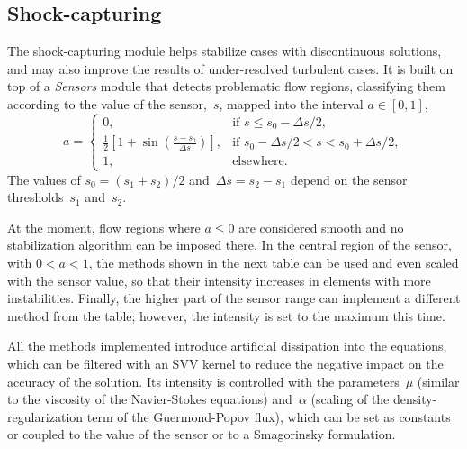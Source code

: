 \documentclass[a4paper,10pt]{report}
\begin{document}
\subsection{Shock-capturing}

The shock-capturing module helps stabilize cases with discontinuous solutions, and may also improve the results of under-resolved turbulent cases. It is built on top of a \textit{Sensors} module that detects problematic flow regions, classifying them according to the value of the sensor,~$s$, mapped into the interval $a \in [0,1]$,
%
\begin{equation*}
    a = \left\{\begin{array}{ll}
        0, & \text{if } s \leq s_0 - \Delta s / 2, \\
        \frac{1}{2}\left[1+\sin\left(\frac{s-s_0}{\Delta s}\right)\right], & \text{if } s_0 - \Delta s / 2 < s < s_0 + \Delta s / 2,  \\
        1, & \text{elsewhere}.
    \end{array}\right.
\end{equation*}
%
The values of $s_0 = (s_1 + s_2)/2$ and~$\Delta s = s_2 - s_1$ depend on the sensor thresholds~$s_1$ and~$s_2$.

At the moment, flow regions where $a \leq 0$ are considered smooth and no stabilization algorithm can be imposed there. In the central region of the sensor, with $0 < a < 1$, the methods shown in the next table can be used and even scaled with the sensor value, so that their intensity increases in elements with more instabilities. Finally, the higher part of the sensor range can implement a different method from the table; however, the intensity is set to the maximum this time.

All the methods implemented introduce artificial dissipation into the equations, which can be filtered with an SVV kernel to reduce the negative impact on the accuracy of the solution. Its intensity is controlled with the parameters~$\mu$ (similar to the viscosity of the Navier-Stokes equations) and~$\alpha$ (scaling of the density-regularization term of the Guermond-Popov flux), which can be set as constants or coupled to the value of the sensor or to a Smagorinsky formulation.
\end{document}
